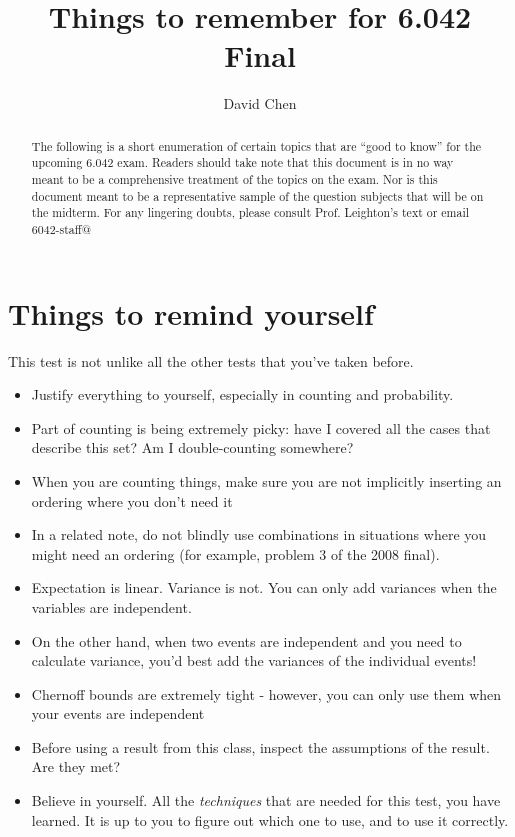 \documentclass[11pt]{article}
\title{Things to remember for 6.042 Final}
\author{David Chen}
\begin{document}
\maketitle

\begin{abstract}
The following is a short enumeration of certain topics that are ``good to know'' for the upcoming 6.042 exam.  Readers should take note that this document is in no way meant to be a comprehensive treatment of the topics on the exam.  Nor is this document meant to be a representative sample of the question subjects that will be on the midterm.  For any lingering doubts, please consult Prof. Leighton's text or email 6042-staff@
\end{abstract}

\section{Things to remind yourself}

This test is not unlike all the other tests that you've taken before.  

\begin{itemize}
	\item Justify everything to yourself, especially in counting and probability.
	\item Part of counting is being extremely picky: have I covered all the cases
	that describe this set?  Am I double-counting somewhere?
	\item When you are counting things, make sure you are not implicitly inserting
	an ordering where you don't need it
	\item In a related note, do not blindly use combinations in situations where you
	might need an ordering (for example, problem 3 of the 2008 final).
	\item Expectation is linear. Variance is not.  You can only add variances when
	the variables are independent.
	\item On the other hand, when two events are independent and you need to calculate
	variance, you'd best add the variances of the individual events!
	\item Chernoff bounds are extremely tight - however, you can only use them when
	your events are independent
	\item Before using a result from this class, inspect the assumptions of the result. 
	Are they met?
	\item Believe in yourself.  All the \emph{techniques} that are needed for this test,
	you have learned.  It is up to you to figure out which one to use, and to use it
	correctly.  
\end{itemize}
\end{document}
